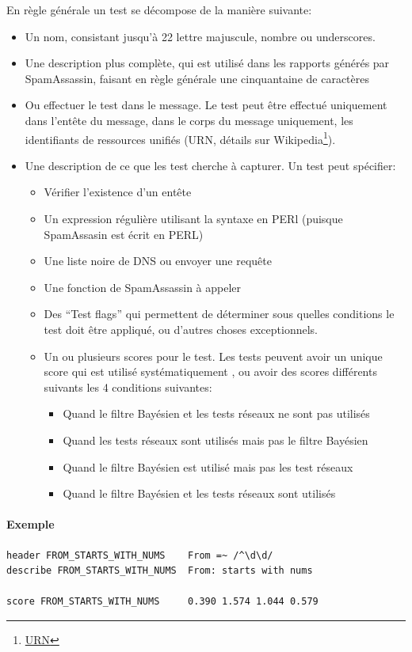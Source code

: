 \documentclass[a4paper,11pt]{article}
\begin{document}
En règle générale un test se décompose de la manière suivante:
\begin{itemize}
 \item Un nom, consistant jusqu'à 22 lettre majuscule, nombre ou underscores.
 \item Une description plus complète, qui est utilisé dans les rapports générés par SpamAssassin, 
 faisant en règle générale une cinquantaine de caractères
 \item Ou effectuer le test dans le message. Le test peut être effectué uniquement dans l'entête du message, 
 dans le corps du message uniquement, les identifiants de ressources unifiés 
 (URN, détails sur Wikipedia\footnote{\href{http://fr.wikipedia.org/wiki/Uniform_Resource_Identifier}{URN}}).
 \item Une description de ce que les test cherche à capturer. Un test peut spécifier:
    \begin{itemize}
     \item Vérifier l'existence d'un entête
     \item Un expression régulière utilisant la syntaxe en PERl (puisque SpamAssasin est écrit en PERL)
     \item Une liste noire de DNS ou envoyer une requête
     \item Une fonction de SpamAssassin à appeler
     \item Des ``Test flags'' qui permettent de déterminer sous quelles conditions le test doit être appliqué, 
     ou d'autres choses exceptionnels.
     \item Un ou plusieurs scores pour le test. Les tests peuvent avoir un unique score qui est utilisé systématiquement
     , ou avoir des scores différents suivants les 4 conditions suivantes:
	\begin{itemize}\label{cond}
	 \item Quand le filtre Bayésien et les tests réseaux ne sont pas utilisés 
	 \item Quand les tests réseaux sont utilisés mais pas le filtre Bayésien
	\item Quand le filtre Bayésien est utilisé mais pas les test réseaux 
	\item Quand le filtre Bayésien et les tests réseaux  sont utilisés
	\end{itemize}
    \end{itemize}
\end{itemize}

\paragraph{Exemple}
\begin{lstlisting}[frame=single]
header FROM_STARTS_WITH_NUMS    From =~ /^\d\d/
describe FROM_STARTS_WITH_NUMS  From: starts with nums

score FROM_STARTS_WITH_NUMS     0.390 1.574 1.044 0.579
\end{lstlisting}
\end{document}

